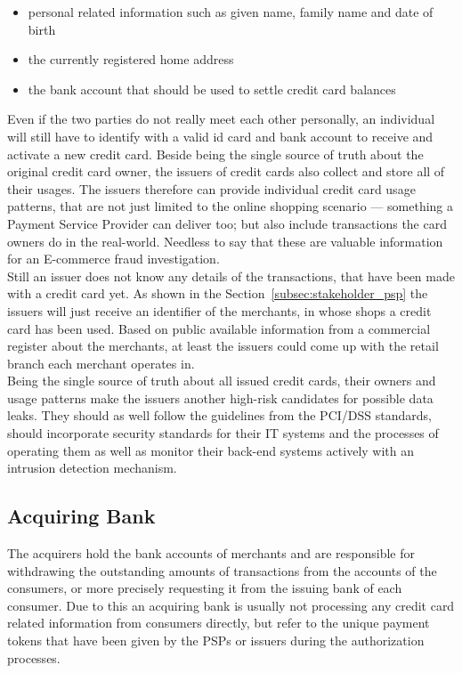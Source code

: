 \begin{itemize}
		\item personal related information such as given name, family name and date of birth
		\item the currently registered home address
		\item the bank account that should be used to settle credit card balances
\end{itemize}

Even if the two parties do not really meet each other personally, an individual will still have to identify with a valid id card and bank account to receive and activate a new credit card. Beside being the single source of truth about the original credit card owner, the issuers of credit cards also collect and store all of their usages. The issuers therefore can provide individual credit card usage patterns, that are not just limited to the online shopping scenario --- something a Payment Service Provider can deliver too; but also include transactions the card owners do in the real-world. Needless to say that these are valuable information for an \gls{E-commerce} fraud investigation. \\

Still an issuer does not know any details of the transactions, that have been made with a credit card yet. As shown in the Section~\ref{subsec:stakeholder_psp} the issuers will just receive an identifier of the merchants, in whose shops a credit card has been used. Based on public available information from a commercial register about the merchants, at least the issuers could come up with the retail branch each merchant operates in. \\

Being the single source of truth about all issued credit cards, their owners and usage patterns make the issuers another high-risk candidates for possible data leaks. They should as well follow the guidelines from the \gls{PCI/DSS} standards, should incorporate security standards for their \gls{IT} systems and the processes of operating them as well as monitor their back-end systems actively with an intrusion detection mechanism.


\subsection{Acquiring Bank}
\label{subsec:stakeholder_acquirer}

The acquirers hold the bank accounts of merchants and are responsible for withdrawing the outstanding amounts of transactions from the accounts of the consumers, or more precisely requesting it from the issuing bank of each consumer. Due to this an acquiring bank is usually not processing any credit card related information from consumers directly, but refer to the unique payment tokens that have been given by the \gls{PSP}s or issuers during the authorization processes. \\

